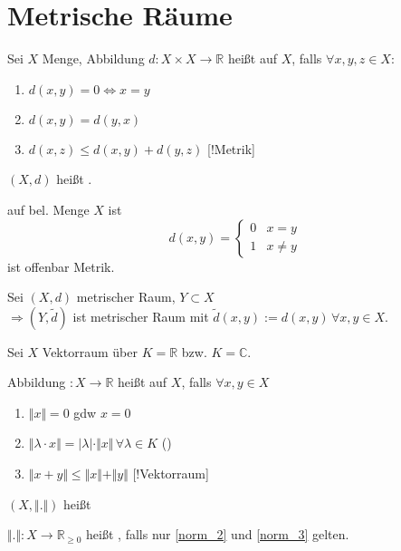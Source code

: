 \section{Metrische Räume}
\begin{definition}[Metrik]
	Sei $X$ Menge, Abbildung $d:X\times X\rightarrow \mathbb{R}$ heißt  auf $X$, falls $\forall x,y,z\in X$:
	\begin{enumerate}[label={\alph*)}]
		\item $d(x,y) = 0 \Leftrightarrow x=y$
		\item $d(x,y) = d(y,x)$ 
		\item $d(x,z)\le d(x,y) + d(y,z)$ [!Metrik]
	\end{enumerate}

	$(X,d)$ heißt .
\end{definition}
\begin{example}
	 auf bel. Menge $X$ ist \[ d(x,y) = \begin{cases}0& x=y \\ 1 & x\neq y \end{cases} \] ist offenbar Metrik.
\end{example}
\begin{example}
	Sei $(X,d)$ metrischer Raum, $Y\subset X$\\
	$\Rightarrow (Y,\tilde{d})$ ist metrischer Raum mit  $\tilde{d}(x,y) := d(x,y)\,\forall x,y\in X$.
\end{example}

\begin{definition}[Norm]
	Sei $X$ Vektorraum über $K=\mathbb{R}$ bzw. $K=\mathbb{C}$.
	
	Abbildung $: X\rightarrow\mathbb{R}$ heißt  auf $X$, falls $\forall x,y\in X$
	\begin{enumerate}[label={\alph*)}]
		\item $\Vert x\Vert = 0$ \gls{gdw} $x = 0$
		\item \label{norm_2} $\Vert \lambda\cdot x\Vert = |\lambda| \cdot \Vert x \Vert\,\forall \lambda\in K$ ()
		\item \label{norm_3} $\Vert x + y\Vert \le \Vert x \Vert + \Vert y \Vert$ [!Vektorraum]
	\end{enumerate}

	$(X,\Vert . \Vert)$ heißt 
\end{definition}
\begin{definition}[Halbnorm]
	$\Vert . \Vert:X\rightarrow\mathbb{R}_{\ge0}$ heißt , falls nur \ref{norm_2} und \ref{norm_3} gelten.
\end{definition}

